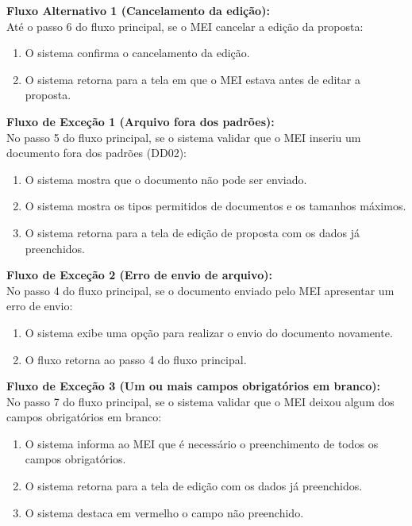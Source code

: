 \noindent\textbf{Fluxo Alternativo 1 (Cancelamento da edição):}\\
Até o passo 6 do fluxo principal, se o MEI cancelar a edição da proposta:
\begin{enumerate}[noitemsep, topsep=-5pt, parsep=0pt]
    \item O sistema confirma o cancelamento da edição.
    \item O sistema retorna para a tela em que o MEI estava antes de editar a proposta.
\end{enumerate}

\noindent\textbf{Fluxo de Exceção 1 (Arquivo fora dos padrões):}\\
No passo 5 do fluxo principal, se o sistema validar que o MEI inseriu um documento fora dos padrões (DD02):
\begin{enumerate}[noitemsep, topsep=-5pt, parsep=0pt]
    \item O sistema mostra que o documento não pode ser enviado.
    \item O sistema mostra os tipos permitidos de documentos e os tamanhos máximos.
    \item O sistema retorna para a tela de edição de proposta com os dados já preenchidos.
\end{enumerate}

\noindent\textbf{Fluxo de Exceção 2 (Erro de envio de arquivo):}\\
No passo 4 do fluxo principal, se o documento enviado pelo MEI apresentar um erro de envio:
\begin{enumerate}[noitemsep, topsep=-5pt, parsep=0pt]
    \item O sistema exibe uma opção para realizar o envio do documento novamente.
    \item O fluxo retorna ao passo 4 do fluxo principal.
\end{enumerate}

\noindent\textbf{Fluxo de Exceção 3 (Um ou mais campos obrigatórios em branco):}\\
No passo 7 do fluxo principal, se o sistema validar que o MEI deixou algum dos campos obrigatórios em branco:
\begin{enumerate}[noitemsep, topsep=-5pt, parsep=0pt]
    \item O sistema informa ao MEI que é necessário o preenchimento de todos os campos obrigatórios.
    \item O sistema retorna para a tela de edição com os dados já preenchidos.
    \item O sistema destaca em vermelho o campo não preenchido.
\end{enumerate}

